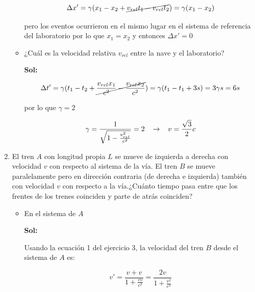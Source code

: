 \documentclass[12pt,a4paper]{article}
\begin{document}
\begin{enumerate}
\begin{itemize}
    \begin{equation*}
        \Delta x' = \gamma (x_1 - x_2 + \cancel{v_{rel}t_1 - v_{rel}t_2}) = \gamma (x_1 - x_2)
    \end{equation*}
    
    pero los eventos ocurrieron en el mismo lugar en el sistema de referencia del laboratorio por lo que $x_1 = x_2$ y entonces $\Delta x' = 0$
    
    
    \item ¿Cuál es la velocidad relativa $v_{rel}$ entre la nave y el laboratorio?
    
    \textbf{Sol:}
    
    \begin{equation*}
        \Delta t' = \gamma (t_1 - t_2 + \cancel{\frac{v_{rel}x_1}{c^2} - \frac{v_{rel} x_2 }{c^2}}) = \gamma (t_1 - t_1 + 3s) = 3\gamma s= 6s
    \end{equation*}
    
    por lo que $\gamma = 2$
    
    \begin{equation*}
        \gamma = \frac{1}{\sqrt{1 - \frac{v_{rel}^{2}}{c^2}}} = 2 \hspace{0.3cm} \rightarrow \hspace{0.3cm} v = \frac{\sqrt{3}}{2} c
    \end{equation*}
    
    
    
\end{itemize}







\item El tren $A$ con longitud propia $L$ se mueve de izquierda a derecha con velocidad $v$ con respecto al sistema de la vía. El tren $B$ se mueve paralelamente pero en dirección contraria (de derecha e izquierda) también con velocidad $v$ con respecto a la vía.¿Cuánto tiempo pasa entre que los frentes de los trenes coinciden y parte de atrás coinciden?

\begin{itemize}
    \item En el sistema de $A$
    
    \textbf{Sol:}
    
    Usando la ecuación 1 del ejercicio 3, la velocidad del tren $B$ desde el sistema de $A$ es:
    
    \begin{equation*}
        v' = \frac{v+v}{1 + \frac{vv}{c^2}} = \frac{2v}{1 + \frac{v^2}{c^2}}
    \end{equation*}
    

\end{itemize}
\end{enumerate}
\end{document}
